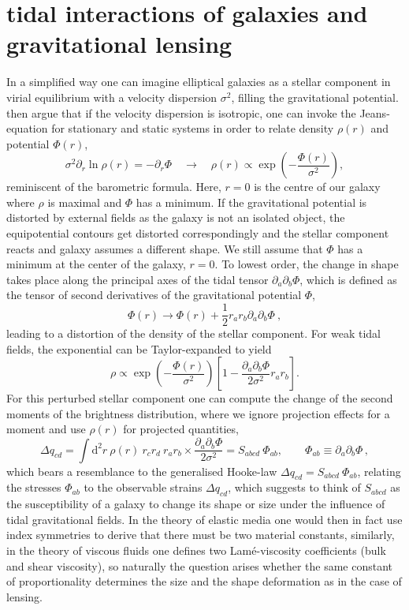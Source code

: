 \documentclass[a4paper,fleqn,usenatbib]{mnras}
\newcommand{\dd}{\mathrm{d}}
\begin{document}
\section{tidal interactions of galaxies and gravitational lensing}\label{sect_tidal}
In a simplified way one can imagine elliptical galaxies as a stellar component in virial equilibrium with a velocity dispersion $\sigma^2$, filling the gravitational potential. \citet{piras_mass_2018} then argue that if the velocity dispersion is isotropic, one can invoke the Jeans-equation for stationary and static systems in order to relate density $\rho(r)$ and potential $\Phi(r)$,
\begin{equation}
\sigma^2\partial_r\ln\rho(r) = -\partial_r\Phi
\quad\rightarrow\quad
\rho(r) \propto \exp\left(-\frac{\Phi(r)}{\sigma^2}\right),
\end{equation}
reminiscent of the barometric formula. Here, $r = 0$ is the centre of our galaxy where $\rho$ is maximal and $\Phi$ has a minimum. If the gravitational potential is distorted by external fields as the galaxy is not an isolated object, the equipotential contours get distorted correspondingly and the stellar component reacts and galaxy assumes a different shape.  We still assume that  $\Phi$ has a minimum at the center of the galaxy, $r = 0$. To lowest order, the change in shape takes place along the principal axes of the tidal tensor $\partial_a\partial_b\Phi$, which is defined as the tensor of second derivatives of the gravitational potential $\Phi$,
\begin{equation}
\Phi(r) \rightarrow \Phi(r) + \frac{1}{2}r_a r_b\partial_a\partial_b\Phi\:,
\end{equation}
leading to a distortion of the density of the stellar component. For weak tidal fields, the exponential can be Taylor-expanded to yield
\begin{equation}
\rho \propto 
\exp\left(-\frac{\Phi(r)}{\sigma^2}\right)\left[1-\frac{\partial_a\partial_b\Phi}{2\sigma^2}r_a r_b\right].
\end{equation}
For this perturbed stellar component one can compute the change of the second moments of the brightness distribution, where we ignore projection effects for a moment and use $\rho(r)$ for projected quantities,
\begin{equation}
\Delta q_{cd} = 
\int\dd^2r\:\rho(r)\: r_c r_d\: r_a r_b\times\frac{\partial_a\partial_b\Phi}{2\sigma^2} = S_{abcd}\:\Phi_{ab},   \qquad  \Phi_{ab} \equiv \partial_a\partial_b\Phi\,,
\end{equation}
which bears a resemblance to the generalised Hooke-law $\Delta q_{cd} = S_{abcd}\:\Phi_{ab}$, relating the stresses $\Phi_{ab}$ to the observable strains $\Delta q_{cd}$, which suggests to think of $S_{abcd}$ as the susceptibility of a galaxy to change its shape or size under the influence of tidal gravitational fields. In the theory of elastic media one would then in fact use index symmetries to derive that there must be two material constants, similarly, in the theory of viscous fluids one defines two Lam{\'e}-viscosity coefficients (bulk and shear viscosity), so naturally the question arises whether the same constant of proportionality determines the size and the shape deformation as in the case of lensing.
\end{document}
